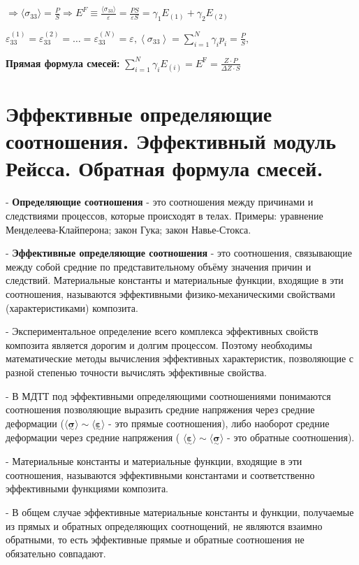 $
\displaystyle
    \Rightarrow\langle\sigma_{33}\rangle=\frac{P}{S} \Rightarrow E^F\equiv\frac{\langle\sigma_{33}\rangle}{\varepsilon}=\frac{PS}{\varepsilon S}=\gamma_1 E_{(1)}+\gamma_2 E_{(2)} \
$

$
\displaystyle
\varepsilon_{33}^{(1)}=\varepsilon_{33}^{(2)}=\ldots=\varepsilon_{33}^{(N)}=\varepsilon,
\left\langle\sigma_{33}\right\rangle=\sum_{i=1}^{N} \gamma_{i} p_{i}=\frac{P}{S}, 
$


\textbf{Прямая формула смесей:} 
$
\sum_{i=1}^{N} \gamma_{i} E_{(i)}=E^{\mathrm{F}}=\frac{Z \cdot P}{\Delta Z \cdot S}$

\section{Эффективные определяющие соотношения. Эффективный модуль Рейсса. Обратная формула смесей.}
- \textbf{Определяющие соотношения} - это соотношения между причинами и следствиями процессов, которые происходят в телах. Примеры: уравнение Менделеева-Клайперона; закон Гука; закон Навье-Стокса.

- \textbf{Эффективные определяющие соотношения} - это соотношения, связывающие между собой средние по представительному объёму значения причин и следствий. Материальные константы и материальные функции, входящие в эти соотношения, называются эффективными физико-механическими свойствами (характеристиками) композита.

- Экспериментальное определение всего комплекса эффективных свойств композита является дорогим и долгим процессом. Поэтому необходимы математические методы вычисления эффективных характеристик, позволяющие с разной степенью точности вычислять эффективные свойства.

- В МДТТ под эффективными определяющими соотношениями понимаются соотношения позволяющие выразить средние напряжения через средние деформации ($\langle\underset{\sim}{\boldsymbol{\sigma}}\rangle \sim\langle\underset{\sim}{\boldsymbol{\varepsilon}}\rangle$ - это прямые соотношения), либо наоборот средние деформации через средние напряжения ( $\langle\underset{\sim}{\boldsymbol{\varepsilon}}\rangle \sim\langle\underset{\sim}{\boldsymbol{\sigma}}\rangle$ - это обратные соотношения).

- Материальные константы и материальные функции, входящие в эти соотношения, называются эффективными константами и соответственно эффективными функциями композита.

- В общем случае эффективные материальные константы и функции, получаемые из прямых и обратных определяющих соотнощений, не являются взаимно обратными, то есть эффективные прямые и обратные соотношения не обязательно совпадают. 

